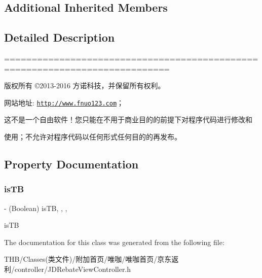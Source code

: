 \subsection*{Additional Inherited Members}


\subsection{Detailed Description}
============================================================================

版权所有 ©2013-\/2016 方诺科技，并保留所有权利。

网站地址\+: \href{http://www.fnuo123.com}{\tt http\+://www.\+fnuo123.\+com}； 



这不是一个自由软件！您只能在不用于商业目的的前提下对程序代码进行修改和

使用；不允许对程序代码以任何形式任何目的的再发布。 

 

\subsection{Property Documentation}
\mbox{\label{interface_j_d_rebate_view_controller_af36ed395a780a3e582bc646639161716}} 
\subsubsection{\texorpdfstring{is\+TB}{isTB}}
{\footnotesize\ttfamily -\/ (Boolean) is\+TB\hspace{0.3cm}{\ttfamily [read]}, {\ttfamily [write]}, {\ttfamily [nonatomic]}, {\ttfamily [assign]}}

is\+TB 

The documentation for this class was generated from the following file\+:\begin{DoxyCompactItemize}
\item 
T\+H\+B/\+Classes(类文件)/附加首页/唯咖/唯咖首页/京东返利/controller/J\+D\+Rebate\+View\+Controller.\+h\end{DoxyCompactItemize}
